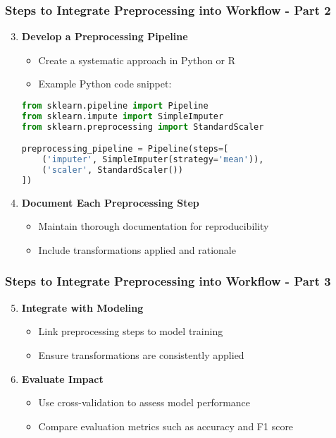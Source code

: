 \documentclass[aspectratio=169]{beamer}
\begin{document}
\begin{frame}[fragile]
    \frametitle{Steps to Integrate Preprocessing into Workflow - Part 2}
    \begin{enumerate}
        \setcounter{enumi}{2} %
        \item \textbf{Develop a Preprocessing Pipeline}
            \begin{itemize}
                \item Create a systematic approach in Python or R
                \item Example Python code snippet:
            \end{itemize}
            \begin{lstlisting}[language=Python]
from sklearn.pipeline import Pipeline
from sklearn.impute import SimpleImputer
from sklearn.preprocessing import StandardScaler

preprocessing_pipeline = Pipeline(steps=[
    ('imputer', SimpleImputer(strategy='mean')),
    ('scaler', StandardScaler())
])
            \end{lstlisting}

        \item \textbf{Document Each Preprocessing Step}
            \begin{itemize}
                \item Maintain thorough documentation for reproducibility
                \item Include transformations applied and rationale
            \end{itemize}
    \end{enumerate}
\end{frame}

\begin{frame}[fragile]
    \frametitle{Steps to Integrate Preprocessing into Workflow - Part 3}
    \begin{enumerate}
        \setcounter{enumi}{4} %
        \item \textbf{Integrate with Modeling}
            \begin{itemize}
                \item Link preprocessing steps to model training
                \item Ensure transformations are consistently applied
            \end{itemize}

        \item \textbf{Evaluate Impact}
            \begin{itemize}
                \item Use cross-validation to assess model performance
                \item Compare evaluation metrics such as accuracy and F1 score
            \end{itemize}
    \end{enumerate}
\end{frame}
\end{document}
